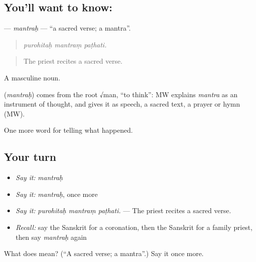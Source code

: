 \subsection*{You'll want to know: }
\textbf{} — \emph{mantraḥ} — \textquotedblleft{}a sacred verse; a mantra\textquotedblright{}.

\begin{quote}
  
\end{quote}

\begin{quote}
\emph{purohitaḥ mantraṃ paṭhati.}
\end{quote}

\begin{quote}
The priest recites a sacred verse.
\end{quote}

A masculine noun.

\begin{cousinweb}
\textbf{} (\emph{mantraḥ}) comes from the root √man, \textquotedblleft{}to think\textquotedblright{}: MW explains \emph{mantra} as an instrument of thought, and gives it as speech, a sacred text, a prayer or hymn (MW).
\end{cousinweb}

\begin{grammarlens}[title={What you've built}]
One more word for telling what happened.
\end{grammarlens}

\subsection*{Your turn}
\begin{itemize}
\raggedright
  \item \emph{Say it:} \emph{mantraḥ}
  \item \emph{Say it:} \emph{mantraḥ}, once more
  \item \emph{Say it:} \emph{purohitaḥ mantraṃ paṭhati.} — The priest recites a sacred verse.
  \item \emph{Recall:} say the Sanskrit for a coronation, then the Sanskrit for a family priest, then say \emph{mantraḥ} again
\end{itemize}

\begin{tcolorbox}[breakable,colback=teal!4,colframe=teal!35!black,title={Before you move on}]
What does  mean? (\textquotedblleft{}A sacred verse; a mantra\textquotedblright{}.) Say it once more.
\end{tcolorbox}
